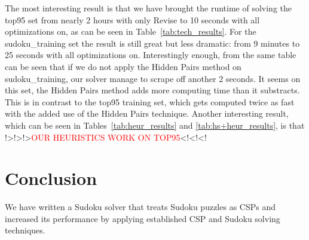 \documentclass[11pt]{article} %
\begin{document}
The most interesting result is that we have brought the runtime of solving the top95 set from nearly 2 hours with only Revise to 10 seconds with all optimizations on, as can be seen in Table~\ref{tab:tech_results}. For the sudoku\_training set the result is still great but less dramatic: from 9 minutes to 25 seconds with all optimizations on. Interestingly enough, from the same table can be seen that if we do not apply the Hidden Pairs method on sudoku\_training, our solver manage to scrape off another 2 seconds. It seems on this set, the Hidden Pairs method adds more computing time than it substracts. This is in contrast to the top95 training set, which gets computed twice as fast with the added use of the Hidden Pairs technique.
Another interesting result, which can be seen in Tables~\ref{tab:heur_results} and \ref{tab:hs+heur_results}, is that !>!>!>\textcolor{red}{OUR HEURISTICS WORK ON TOP95}<!<!<!

\section{Conclusion}

We have written a Sudoku solver that treats Sudoku puzzles as CSPs and increased its performance by applying established CSP and Sudoku solving techniques.



\end{document}
